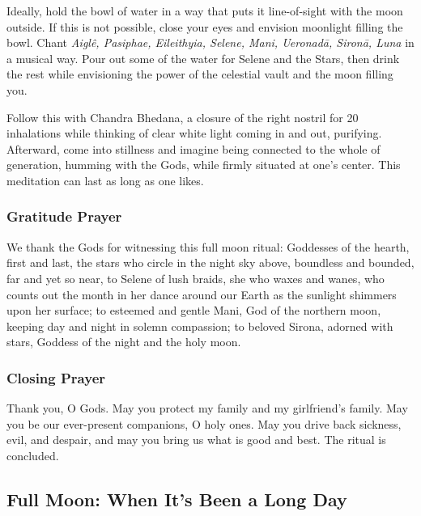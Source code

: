 \documentclass[
]{book}
\begin{document}
Ideally, hold the bowl of water in a way that puts it line-of-sight with the moon outside. If this is not possible, close your eyes and envision moonlight filling the bowl. Chant \emph{Aiglê, Pasiphae, Eileithyia, Selene, Mani, Ueronadā, Sironā, Luna} in a musical way. Pour out some of the water for Selene and the Stars, then drink the rest while envisioning the power of the celestial vault and the moon filling you.

Follow this with Chandra Bhedana, a closure of the right nostril for 20 inhalations while thinking of clear white light coming in and out, purifying. Afterward, come into stillness and imagine being connected to the whole of generation, humming with the Gods, while firmly situated at one's center. This meditation can last as long as one likes.

\hypertarget{gratitude-prayer-1}{%
\subsubsection{Gratitude Prayer}\label{gratitude-prayer-1}}

We thank the Gods for witnessing this full moon ritual:
Goddesses of the hearth, first and last,
the stars who circle in the night sky above,
boundless and bounded, far and yet so near,
to Selene of lush braids,
she who waxes and wanes,
who counts out the month in her dance
around our Earth as the sunlight shimmers upon her surface;
to esteemed and gentle Mani,
God of the northern moon,
keeping day and night in solemn compassion;
to beloved Sirona, adorned with stars,
Goddess of the night and the holy moon.

\hypertarget{closing-prayer-1}{%
\subsubsection{Closing Prayer}\label{closing-prayer-1}}

Thank you, O Gods.
May you protect my family and my girlfriend's family.
May you be our ever-present companions, O holy ones.
May you drive back sickness, evil, and despair,
and may you bring us what is good and best.
The ritual is concluded.

\hypertarget{full-moon-when-its-been-a-long-day}{%
\subsection{Full Moon: When It's Been a Long Day}\label{full-moon-when-its-been-a-long-day}}
\end{document}
